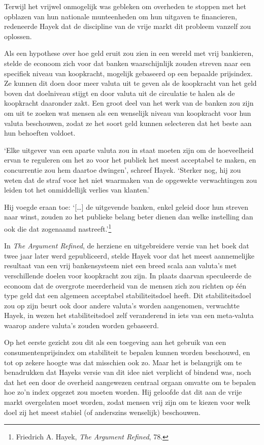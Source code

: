 \documentclass[
  a5paper,
  smalldemyvopaper,11pt,twoside,onecolumn,openright,extrafontsizes,
hidelinks]{memoir}
\begin{document}
Terwijl het vrijwel onmogelijk was gebleken om overheden te stoppen met
het opblazen van hun nationale munteenheden om hun uitgaven te
financieren, redeneerde Hayek dat de discipline van de vrije markt dit
probleem vanzelf zou oplossen.

Als een hypothese over hoe geld eruit zou zien in een wereld met vrij
bankieren, stelde de econoom zich voor dat banken waarschijnlijk zouden
streven naar een specifiek niveau van koopkracht, mogelijk gebaseerd op
een bepaalde prijsindex. Ze kunnen dit doen door meer valuta uit te
geven als de koopkracht van het geld boven dat doelniveau stijgt en door
valuta uit de circulatie te halen als de koopkracht daaronder zakt. Een
groot deel van het werk van de banken zou zijn om uit te zoeken wat
mensen als een wenselijk niveau van koopkracht voor hun valuta
beschouwen, zodat ze het soort geld kunnen selecteren dat het beste aan
hun behoeften voldoet.

`Elke uitgever van een aparte valuta zou in staat moeten zijn om de
hoeveelheid ervan te reguleren om het zo voor het publiek het meest
acceptabel te maken, en concurrentie zou hem daartoe dwingen', schreef
Hayek. `Sterker nog, hij zou weten dat de straf voor het niet waarmaken
van de opgewekte verwachtingen zou leiden tot het onmiddellijk verlies
van klanten.'

Hij voegde eraan toe: `{[}\ldots{]} de uitgevende banken, enkel geleid
door hun streven naar winst, zouden zo het publieke belang beter dienen
dan welke instelling dan ook die dat zogenaamd nastreeft.'\footnote{Friedrich
  A. Hayek, \emph{The Argument Refined}, 78.}

In \emph{The Argument Refined}, de herziene en uitgebreidere versie van
het boek dat twee jaar later werd gepubliceerd, stelde Hayek voor dat
het meest aannemelijke resultaat van een vrij bankensysteem niet een
breed scala aan valuta's met verschillende doelen voor koopkracht zou
zijn. In plaats daarvan speculeerde de econoom dat de overgrote
meerderheid van de mensen zich zou richten op één type geld dat een
algemeen acceptabel stabiliteitsdoel heeft. Dit stabiliteitsdoel zou op
zijn beurt ook door andere valuta's worden aangenomen, verwachtte Hayek,
in wezen het stabiliteitsdoel zelf veranderend in iets van een
meta-valuta waarop andere valuta's zouden worden gebaseerd.

Op het eerste gezicht zou dit als een toegeving aan het gebruik van een
consumentenprijsindex om stabiliteit te bepalen kunnen worden beschouwd,
en tot op zekere hoogte was dat misschien ook zo. Maar het is belangrijk
om te benadrukken dat Hayeks versie van dit idee niet verplicht of
bindend was, noch dat het een door de overheid aangewezen centraal
orgaan omvatte om te bepalen hoe zo'n index opgezet zou moeten worden.
Hij geloofde dat dit aan de vrije markt overgelaten moet worden, zodat
mensen vrij zijn om te kiezen voor welk doel zij het meest stabiel (of
anderszins wenselijk) beschouwen.
\end{document}

